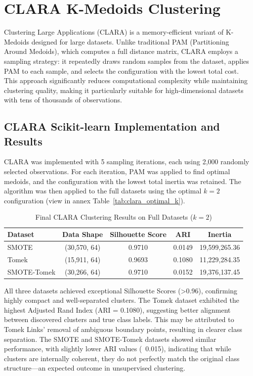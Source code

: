 \section{CLARA K-Medoids Clustering}

Clustering Large Applications (CLARA) is a memory-efficient variant of K-Medoids designed for large datasets. Unlike traditional PAM (Partitioning Around Medoids), which computes a full distance matrix, CLARA employs a sampling strategy: it repeatedly draws random samples from the dataset, applies PAM to each sample, and selects the configuration with the lowest total cost. This approach significantly reduces computational complexity while maintaining clustering quality, making it particularly suitable for high-dimensional datasets with tens of thousands of observations.


\subsection{CLARA Scikit-learn Implementation and Results}

CLARA was implemented with 5 sampling iterations, each using 2,000 randomly selected observations. For each iteration, PAM was applied to find optimal medoids, and the configuration with the lowest total inertia was retained. The algorithm was then applied to the full datasets using the optimal $k=2$ configuration (view in annex Table~\ref{tab:clara_optimal_k}).

\begin{table}[H]
\centering
\caption{Final CLARA Clustering Results on Full Datasets ($k=2$)}
\label{tab:clara_final_results}
\begin{tabular}{|l|c|c|c|c|}
\hline
\textbf{Dataset} & \textbf{Data Shape} & \textbf{Silhouette Score} & \textbf{ARI} & \textbf{Inertia} \\ \hline
SMOTE & (30,570, 64) & 0.9710 & 0.0149 & 19,599,265.36 \\ \hline
Tomek & (15,911, 64) & 0.9693 & 0.1080 & 11,229,284.35 \\ \hline
SMOTE-Tomek & (30,266, 64) & 0.9710 & 0.0152 & 19,376,137.45 \\ \hline
\end{tabular}
\end{table}

All three datasets achieved exceptional Silhouette Scores (>0.96), confirming highly compact and well-separated clusters. The Tomek dataset exhibited the highest Adjusted Rand Index (ARI = 0.1080), suggesting better alignment between discovered clusters and true class labels. This may be attributed to Tomek Links' removal of ambiguous boundary points, resulting in clearer class separation. The SMOTE and SMOTE-Tomek datasets showed similar performance, with slightly lower ARI values (~0.015), indicating that while clusters are internally coherent, they do not perfectly match the original class structure—an expected outcome in unsupervised clustering.

